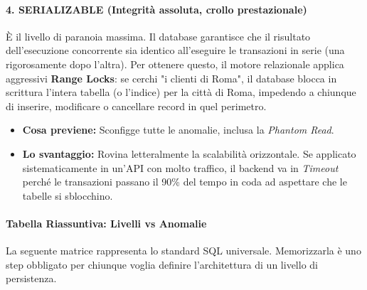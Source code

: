 \paragraph{4. SERIALIZABLE (Integrità assoluta, crollo prestazionale)}
È il livello di paranoia massima. Il database garantisce che il risultato dell'esecuzione concorrente sia identico all'eseguire le transazioni in serie (una rigorosamente dopo l'altra). 
Per ottenere questo, il motore relazionale applica aggressivi \textbf{Range Locks}: se cerchi "i clienti di Roma", il database blocca in scrittura l'intera tabella (o l'indice) per la città di Roma, impedendo a chiunque di inserire, modificare o cancellare record in quel perimetro.
\begin{itemize}
    \item \textbf{Cosa previene:} Sconfigge tutte le anomalie, inclusa la \textit{Phantom Read}.
    \item \textbf{Lo svantaggio:} Rovina letteralmente la scalabilità orizzontale. Se applicato sistematicamente in un'API con molto traffico, il backend va in \textit{Timeout} perché le transazioni passano il 90\% del tempo in coda ad aspettare che le tabelle si sblocchino.
\end{itemize}

\paragraph{Tabella Riassuntiva: Livelli vs Anomalie}

La seguente matrice rappresenta lo standard SQL universale. Memorizzarla è uno step obbligato per chiunque voglia definire l'architettura di un livello di persistenza.

\begin{table}[h!]
\centering
{}
\end{table}

